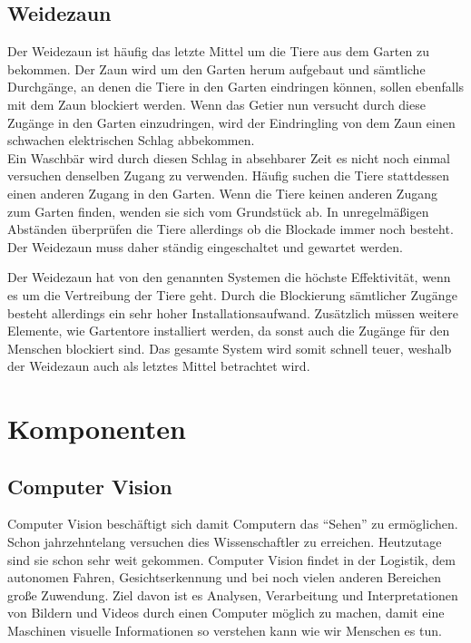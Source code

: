 \subsection{Weidezaun}

Der Weidezaun ist häufig das letzte Mittel um die Tiere aus dem Garten zu bekommen. Der Zaun wird um den Garten herum aufgebaut und sämtliche Durchgänge, an denen die Tiere in den Garten eindringen  können, sollen ebenfalls mit dem Zaun blockiert werden. Wenn das Getier nun versucht durch diese Zugänge in den Garten einzudringen, wird der Eindringling von dem Zaun einen schwachen elektrischen Schlag abbekommen.
\\
Ein Waschbär wird durch diesen Schlag in absehbarer Zeit es nicht noch einmal versuchen denselben Zugang zu verwenden. Häufig suchen die Tiere stattdessen einen anderen Zugang in den Garten. Wenn die Tiere keinen anderen Zugang zum Garten finden, wenden sie sich vom Grundstück ab. In unregelmäßigen Abständen überprüfen die Tiere allerdings ob die Blockade immer noch besteht. Der Weidezaun muss daher ständig eingeschaltet und gewartet werden.\cite{anti_wasch}

Der Weidezaun hat von den genannten Systemen die höchste Effektivität, wenn es um die Vertreibung der Tiere geht. Durch die Blockierung sämtlicher Zugänge besteht allerdings ein sehr hoher Installationsaufwand. Zusätzlich müssen weitere Elemente, wie Gartentore installiert werden, da sonst auch die Zugänge für den Menschen blockiert sind. Das gesamte System wird somit schnell teuer, weshalb der Weidezaun auch als letztes Mittel betrachtet wird.

\section{Komponenten}

\subsection{Computer Vision}

Computer Vision beschäftigt sich damit Computern das \enquote{Sehen} zu ermöglichen. Schon jahrzehntelang versuchen dies Wissenschaftler zu erreichen. Heutzutage sind sie schon sehr weit gekommen. Computer Vision findet in der Logistik, dem autonomen Fahren, Gesichtserkennung und bei noch vielen anderen Bereichen große Zuwendung. Ziel davon ist es Analysen, Verarbeitung und Interpretationen von Bildern und Videos durch einen Computer möglich zu machen, damit eine Maschinen visuelle Informationen so verstehen kann wie wir Menschen es tun. \cite[Seite 3-7]{cv_Szeliski}



